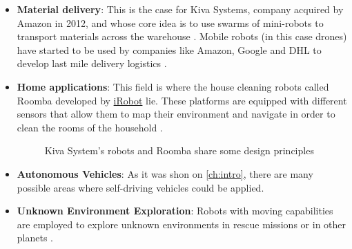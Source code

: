 \begin{itemize}
  \item \textbf{Material delivery}: This is the case for Kiva Systems, company acquired by Amazon in 2012, and whose core idea is to use swarms of mini-robots to transport materials across the warehouse . Mobile robots (in this case drones) have started to be used by companies like Amazon, Google and DHL to develop last mile delivery logistics .

  \item \textbf{Home applications}: This field is where the house cleaning robots called Roomba developed by \href{https://www.irobot.es/}{iRobot} lie. These platforms are equipped with different sensors that allow them to map their environment and navigate in order to clean the rooms of the household .

  \begin{figure}[t]
    \centering
     \quad
    \label{fig:kivarromba}
    \caption[Kiva Systems and Roomba]{Kiva System's robots and Roomba share some design principles}
  \end{figure} 

  \item \textbf{Autonomous Vehicles}: As it was shon on \autoref{ch:intro}, there are many possible areas where self-driving vehicles could be applied.

  \item \textbf{Unknown Environment Exploration}: Robots with moving capabilities are employed to explore unknown environments in rescue missions  or in other planets .
  

\end{itemize}
